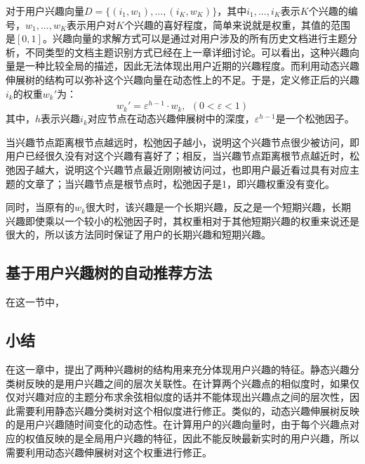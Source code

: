 对于用户兴趣向量$D=\{(i_1,w_1),...,(i_K,w_K)\}$，其中$i_1,...,i_K$表示$K$个兴趣的编号，$w_1,...,w_K$表示用户对$K$个兴趣的喜好程度，简单来说就是权重，其值的范围是$[0,1]$。兴趣向量的求解方式可以是通过对用户涉及的所有历史文档进行主题分析，不同类型的文档主题识别方式已经在上一章详细讨论。可以看出，这种兴趣向量是一种比较全局的描述，因此无法体现出用户近期的兴趣程度。而利用动态兴趣伸展树的结构可以弥补这个兴趣向量在动态性上的不足。于是，定义修正后的兴趣$i_k$的权重$w_k'$为：
\begin{equation}
  w_k'=\varepsilon^{h-1}\cdot w_k,~~(0<\varepsilon<1)
\end{equation}
其中，$h$表示兴趣$i_k$对应节点在动态兴趣伸展树中的深度，$\varepsilon^{h-1}$是一个松弛因子。

当兴趣节点距离根节点越远时，松弛因子越小，说明这个兴趣节点很少被访问，即用户已经很久没有对这个兴趣有喜好了；相反，当兴趣节点距离根节点越近时，松弛因子越大，说明这个兴趣节点最近刚刚被访问过，也即用户最近看过具有对应主题的文章了；当兴趣节点是根节点时，松弛因子是1，即兴趣权重没有变化。

同时，当原有的$w_k$很大时，该兴趣是一个长期兴趣，反之是一个短期兴趣，长期兴趣即使乘以一个较小的松弛因子时，其权重相对于其他短期兴趣的权重来说还是很大的，所以该方法同时保证了用户的长期兴趣和短期兴趣。

\subsection{基于用户兴趣树的自动推荐方法}
在这一节中，

\subsection{小结}
在这一章中，提出了两种兴趣树的结构用来充分体现用户兴趣的特征。静态兴趣分类树反映的是用户兴趣之间的层次关联性。在计算两个兴趣点的相似度时，如果仅仅对兴趣对应的主题分布求余弦相似度的话并不能体现出兴趣点之间的层次性，因此需要利用静态兴趣分类树对这个相似度进行修正。类似的，动态兴趣伸展树反映的是用户兴趣随时间变化的动态性。在计算用户的兴趣向量时，由于每个兴趣点对应的权值反映的是全局用户兴趣的特征，因此不能反映最新实时的用户兴趣，所以需要利用动态兴趣伸展树对这个权重进行修正。

